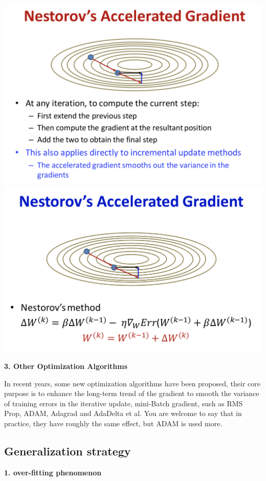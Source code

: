 \documentclass{article}
\begin{document}
	\includegraphics[scale=0.2]{95.png}
	\includegraphics[scale=0.2]{96.png}
	
	\textbf{3. Other Optimization Algorithms}
	
	In recent years, some new optimization algorithms have been proposed, their core purpose is to enhance the long-term trend of the gradient to smooth the variance of training errors in the iterative update, mini-Batch gradient, such as RMS Prop, ADAM, Adagrad and AdaDelta et al. You are welcome to say that in practice, they have roughly the same effect, but ADAM is used more.
	
	\subsection{Generalization strategy}
	
	\textbf{1. over-fitting phenomenon}
	
\end{document}
